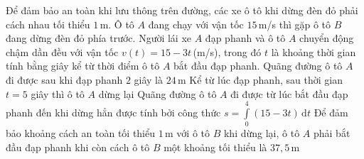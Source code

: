 \begin{ex}%
	Để đảm bảo an toàn khi lưu thông trên đường, các xe ô tô khi dừng đèn đỏ phải cách nhau tối thiểu $1$\,m. Ô tô $A$ đang chạy với vận tốc $15$\,m/s thì gặp ô tô $B$ đang dừng đèn đỏ phía trước. Người lái xe $A$ đạp phanh và ô tô $A$ chuyển động chậm dần đều với vận tốc $v(t)=15-3t$\,(m/s), trong đó $t$ là khoảng thời gian tính bằng giây kể từ thời điểm ô tô $A$ bắt đầu đạp phanh.
	\choiceTF
	{\True Quãng đường ô tô $A$ đi được sau khi đạp phanh $2$ giây là $24$\,m}
	{\True Kể từ lúc đạp phanh, sau thời gian $t=5$ giây thì ô tô $A$ dừng lại}
	{Quãng đường ô tô $A$ đi được từ lúc bắt đầu đạp phanh đến khi dừng hẳn được tính bởi công thức $s=\displaystyle\int\limits_0^4 (15-3t)\mathrm{\,d}t$}
	{Để đảm bảo khoảng cách an toàn tối thiểu $1$\,m với ô tô $B$ khi dừng lại, ô tô $A$ phải bắt đầu đạp phanh khi còn cách ô tô $B$ một khoảng tối thiểu là $37{,}5$\,m}
\end{ex}

